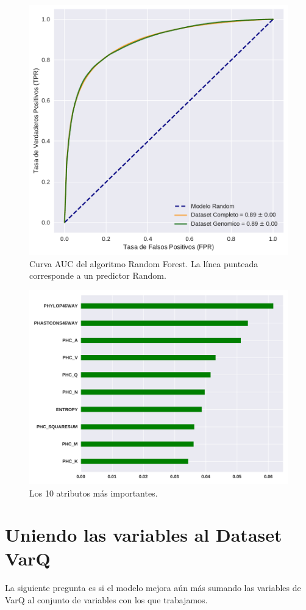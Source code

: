 \begin{figure}[H]
    \centering
    \includegraphics[scale=0.73]{documents/latex/figures/3/auc_3.pdf}
    \caption{Curva AUC del algoritmo Random Forest. La línea punteada corresponde a un predictor Random.}
    \label{fig:auc_3}
\end{figure}

\begin{figure}[H]
    \centering
    \includegraphics[scale=0.73]{documents/latex/figures/3/importance_3.pdf}
    \caption{Los 10 atributos más importantes.}
    \label{fig:importance_3}
\end{figure}


\section{Uniendo las variables al Dataset VarQ}

La siguiente pregunta es si el modelo mejora aún más sumando las variables de VarQ al conjunto de variables con los que trabajamos.
